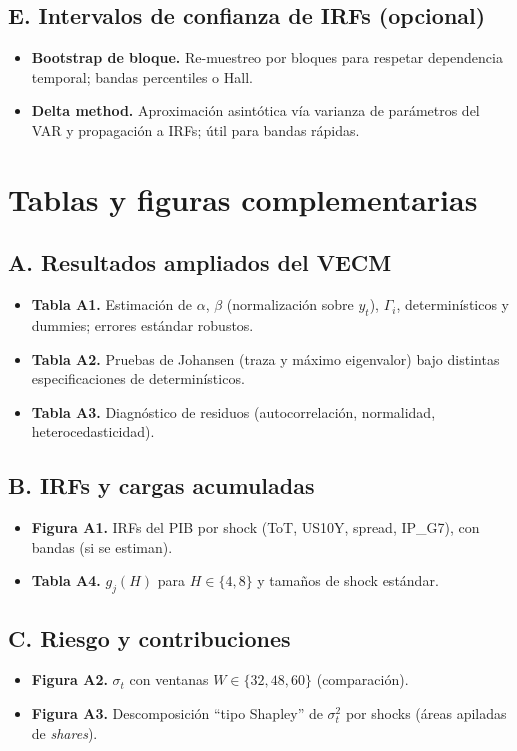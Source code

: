\documentclass[11pt,a4paper]{article}
\newcommand{\1}{\mathbf{1}}
\begin{document}
\subsection*{E. Intervalos de confianza de IRFs (opcional)}
\begin{itemize}
  \item \textbf{Bootstrap de bloque.} Re-muestreo por bloques para respetar dependencia temporal; bandas percentiles o Hall.
  \item \textbf{Delta method.} Aproximación asintótica vía varianza de parámetros del VAR y propagación a IRFs; útil para bandas rápidas.
\end{itemize}


\section{Tablas y figuras complementarias}
\label{app:extras}

\subsection*{A. Resultados ampliados del VECM}
\begin{itemize}
  \item \textbf{Tabla A1.} Estimación de $\alpha$, $\beta$ (normalización sobre $y_t$), $\Gamma_i$, determinísticos y dummies; errores estándar robustos.
  \item \textbf{Tabla A2.} Pruebas de Johansen (traza y máximo eigenvalor) bajo distintas especificaciones de determinísticos.
  \item \textbf{Tabla A3.} Diagnóstico de residuos (autocorrelación, normalidad, heterocedasticidad).
\end{itemize}

\subsection*{B. IRFs y cargas acumuladas}
\begin{itemize}
  \item \textbf{Figura A1.} IRFs del PIB por shock (ToT, US10Y, spread, IP\_G7), con bandas (si se estiman).
  \item \textbf{Tabla A4.} $g_j(H)$ para $H\in\{4,8\}$ y tamaños de shock estándar.
\end{itemize}

\subsection*{C. Riesgo y contribuciones}
\begin{itemize}
  \item \textbf{Figura A2.} $\sigma_t$ con ventanas $W\in\{32,48,60\}$ (comparación).
  \item \textbf{Figura A3.} Descomposición ``tipo Shapley'' de $\sigma_t^2$ por shocks (áreas apiladas de \emph{shares}).
\end{itemize}
\end{document}
